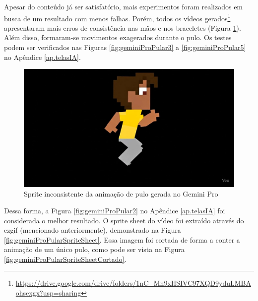 Apesar do conteúdo já ser satisfatório, mais experimentos foram realizados em busca de um resultado com menos falhas. Porém, todos os vídeos gerados\footnote{\url{https://drive.google.com/drive/folders/1nC_Mn9xHSIVC97XQD9yduLMBAohsexgx?usp=sharing}} apresentaram mais erros de consistência nas mãos e nos braceletes (Figura \ref{fig:geminiProPularInconsistente}). Além disso, formaram-se movimentos exagerados durante o pulo. Os testes podem ser verificados nas Figuras \ref{fig:geminiProPular3} a \ref{fig:geminiProPular5} no Apêndice \ref{ap.telasIA}.

\begin{figure}[htbp]
    \centering
    \caption{\small Sprite inconsistente da animação de pulo gerada no Gemini Pro}
    \label{fig:geminiProPularInconsistente}
    \includegraphics[width=0.6\linewidth]{figs/geminiPro/chat7/print17.jpg}
\end{figure}


Dessa forma, a Figura \ref{fig:geminiProPular2} no Apêndice \ref{ap.telasIA} foi considerada o melhor resultado. O sprite sheet do vídeo foi extraído através do ezgif (mencionado anteriormente), demonstrado na Figura \ref{fig:geminiProPularSpriteSheet}. Essa imagem foi cortada de forma a conter a animação de um único pulo, como pode ser vista na Figura \ref{fig:geminiProPularSpriteSheetCortado}. 

